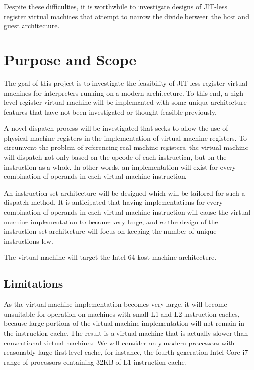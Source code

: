 		Despite these difficulties, it is worthwhile to investigate designs of JIT-less register virtual machines that attempt to narrow the divide between the host and guest architecture.
	
		
	\section{Purpose and Scope}
		The goal of this project is to investigate the feasibility of JIT-less register virtual machines for interpreters running on a modern architecture. To this end, a high-level register virtual machine will be implemented with some unique architecture features that have not been investigated or thought feasible previously.
		
		A novel dispatch process will be investigated that seeks to allow the use of physical machine registers in the implementation of virtual machine registers. To circumvent the problem of referencing real machine registers, the virtual machine will dispatch not only based on the opcode of each instruction, but on the instruction as a whole. In other words, an implementation will exist for every combination of operands in each virtual machine instruction.
	
		An instruction set architecture will be designed which will be tailored for such a dispatch method. It is anticipated that having implementations for every combination of operands in each virtual machine instruction will cause the virtual machine implementation to become very large, and so the design of the instruction set architecture will focus on keeping the number of unique instructions low.
		
		The virtual machine will target the Intel 64 host machine architecture.
		
		\subsection{Limitations}
			As the virtual machine implementation becomes very large, it will become unsuitable for operation on machines with small L1 and L2 instruction caches, because large portions of the virtual machine implementation will not remain in the instruction cache. The result is a virtual machine that is actually slower than conventional virtual machines. We will consider only modern processors with reasonably large first-level cache, for instance, the fourth-generation Intel Core i7 range of processors containing 32KB of L1 instruction cache.
			
